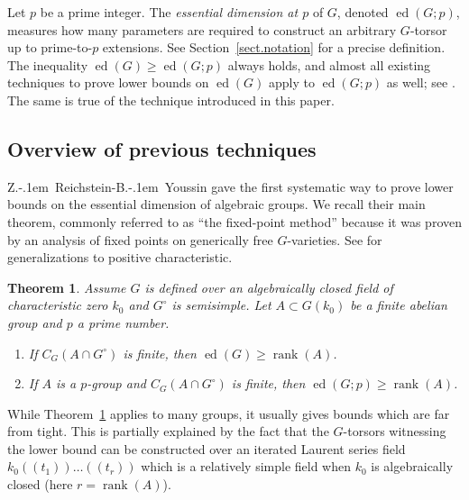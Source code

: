 \documentclass[12pt]{amsart}
\numberwithin{equation}{section}
\newtheorem{theorem}{Theorem}[section]
\theoremstyle{definition}
\newcommand{\ed}{\operatorname{ed}}
\newcommand{\rank}{\operatorname{rank}}
\begin{document}
Let $p$ be a prime integer. The \emph{essential dimension at $p$} of $G$, denoted $\ed(G;p)$, measures how many parameters are required to construct an arbitrary $G$-torsor {up to prime-to-$p$} extensions. See Section~\ref{sect.notation} for a precise definition. The inequality $\ed(G) \geq \ed(G;p)$ always holds, and almost all existing techniques to prove lower bounds on $\ed(G)$ apply to $\ed(G;p)$ as well; see \cite[Section 5]{reichstein2010essential}. The same is true of the technique introduced in this paper.

\subsection{Overview of previous techniques}
Z.\kern-.1em\ Reichstein-B.\kern-.1em\ Youssin gave the first systematic way to prove lower bounds on the essential dimension of algebraic groups. We recall their main theorem, commonly referred to as  ``the fixed-point method'' because it was proven by an analysis of fixed points on generically free $G$-varieties. See \cite{gille2009lower,chernousov2006lower} for generalizations to positive characteristic. 

\begin{theorem}{\cite[Theorem 7.7]{reichstein-youssin}}\label{thm.fixed_pt}
    Assume $G$ is defined over an algebraically closed field of characteristic zero $k_0$ and $G^{\circ}$ is semisimple. Let $A\subset G(k_0)$ be a finite abelian group and $p$ a prime number.
    \begin{enumerate}
        \item If $C_G(A\cap G^{\circ})$ is finite, then $\ed(G) \geq \rank(A)$. 
        \item If $A$ is a $p$-group and $C_G(A\cap G^{\circ})$ is finite, then $\ed(G;p)\geq \rank(A)$.
    \end{enumerate}
\end{theorem}
 While Theorem~\ref{thm.fixed_pt} applies to many groups, it usually gives bounds which are far from tight. This is partially explained by the fact that the $G$-torsors witnessing the lower bound can be constructed over an iterated Laurent series field $k_0(\!(t_1)\!)\dots(\!(t_r)\!)$ which is a relatively simple field when $k_0$ is algebraically closed (here $r = \rank(A)$). 
\end{document}
